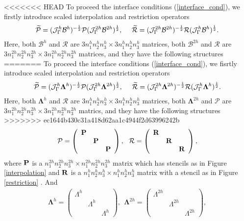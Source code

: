 <<<<<<< HEAD
To proceed the interface conditions (\ref{interface_cond}), we firstly introduce scaled interpolation and restriction operators
\[\widetilde{\mathcal{P}} = (\mathcal{J}^h_\Gamma \mathcal{B}^h)^{-\frac{1}{2}}\mathcal{P}(\mathcal{J}^{2h}_\Gamma \mathcal{B}^{2h})^{\frac{1}{2}},\ \ \ \ \widetilde{\mathcal{R}} =  (\mathcal{J}^{2h}_\Gamma \mathcal{B}^{2h})^{-\frac{1}{2}}\mathcal{R}(\mathcal{J}^{h}_\Gamma \mathcal{B}^h)^{\frac{1}{2}}.\]
Here, both $\mathcal{B}^{h}$ and $\mathcal{R}$ are $3n_1^hn_2^hn_3^h\times 3n_1^hn_2^hn_3^h$ matrices, both $\mathcal{B}^{2h}$ and $\mathcal{R}$ are $3n_1^{2h}n_2^{2h}n_3^{2h}\times 3n_1^{2h}n_2^{2h}n_3^{2h}$ matrices, and they have the following structures
=======
To proceed the interface conditions (\ref{interface_cond}), we fisrtly introduce scaled interpolation and restriction operators
\[\widetilde{\mathcal{P}} = (\mathcal{J}^h_\Gamma \bm{\Lambda}^h)^{-\frac{1}{2}}\mathcal{P}(\mathcal{J}^{2h}_\Gamma \bm{\Lambda}^{2h})^{\frac{1}{2}},\ \ \ \ \widetilde{\mathcal{R}} =  (\mathcal{J}^{2h}_\Gamma \bm{\Lambda}^{2h})^{-\frac{1}{2}}\mathcal{R}(\mathcal{J}^{h}_\Gamma \bm{\Lambda}^h)^{\frac{1}{2}}.\]
Here, both $\bm{\Lambda}^{h}$ and $\mathcal{R}$ are $3n_1^hn_2^hn_3^h\times 3n_1^hn_2^hn_3^h$ matrices, both $\bm{\Lambda}^{2h}$ and $\mathcal{P}$ are $3n_1^{2h}n_2^{2h}n_3^{2h}\times 3n_1^{2h}n_2^{2h}n_3^{2h}$ matrics, and they have the following structures
>>>>>>> ec1644b430c31a418d62aa1c4944f2d63996242b
\begin{align}\label{iandr}
\mathcal{P} = \left(\begin{array}{ccc}
{\bf P}& ~  & ~ \\
~ & {\bf P} & ~ \\
~ &~  &{\bf P}\end{array}\right),\ \ \mathcal{R} = \left(\begin{array}{ccc}
{\bf R}& ~  & ~ \\
~ & {\bf R} & ~ \\
~ &~  &{\bf R}\end{array}\right),
\end{align}
where $\bf P$ is a $n_1^{2h}n_2^{2h}n_3^{2h}\times n_1^{2h}n_2^{2h}n_3^{2h}$ matrix which has stencils as in Figure \ref{interpolation} and $\bf R$ is a $n_1^hn_2^hn_3^h\times n_1^hn_2^hn_3^h$ matrix with a stencil as in Figure \ref{restriction}
. And
\begin{align}
\bm{\Lambda}^h = \left(\begin{array}{ccc}
\Lambda^h& ~  & ~ \\
~ & \Lambda^h & ~ \\
~ &~  &\Lambda^h\end{array}\right), \ \ \bm{\Lambda}^{2h} = \left(\begin{array}{ccc}
\Lambda^{2h}& ~  & ~ \\
~ & \Lambda^{2h} & ~ \\
~ &~  &\Lambda^{2h}\end{array}\right),
\end{align}
